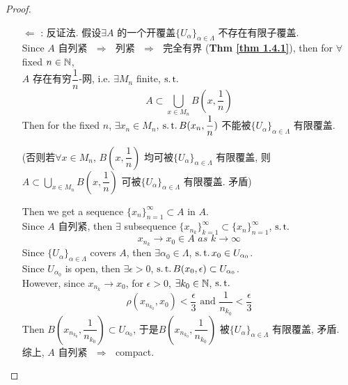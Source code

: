 \begin{thm}
\begin{proof}
\begin{enumerate}
				\item[$\Leftarrow$]: 反证法. 假设$\exists A$ 的一个开覆盖$\{ U_\alpha \}_{\alpha \in \Lambda}$ 不存在有限子覆盖. \\
				Since $A$ 自列紧 $\,\, \Rightarrow \,\,$ 列紧 $\,\, \Rightarrow \,\,$ 完全有界 (\textbf{Thm \ref{thm 1.4.1}}), then for $\forall$ fixed $n \in \mathbb{N}$, \\
				$A$ 存在有穷$\dfrac{1}{n}$-网, i.e. $\exists M_n$ finite, $\operatorname{s.t.}$
				\[ A \subset \bigcup_{x \in M_n} B(x , \frac{1}{n}) \]
				Then for the fixed $n$, $\exists x_n \in M_n$, $\operatorname{s.t.} B(x_n , \dfrac{1}{n})$ 不能被$\{ U_\alpha \}_{\alpha \in \Lambda}$ 有限覆盖.
				\begin{center}
					(否则若$\forall x \in M_n$, $B(x , \dfrac{1}{n})$ 均可被$\{ U_\alpha \}_{\alpha \in \Lambda}$ 有限覆盖, 则$A \subset \bigcup_{x \in M_n} B(x , \dfrac{1}{n})$ 可被$\{ U_\alpha \}_{\alpha \in \Lambda}$ 有限覆盖. 矛盾)
				\end{center}
				Then we get a sequence $\{ x_n \}_{n = 1}^{\infty} \subset A$ in $A$. \\
				Since $A$ 自列紧, then $\exists$ subsequence $\{ x_{n_k} \}_{k = 1}^{\infty} \subset \{ x_n \}_{n = 1}^{\infty}$, $\operatorname{s.t.}$
				\[ x_{n_k} \to x_0 \in A \,\, as \,\, k \to \infty \]
				Since $\{ U_\alpha \}_{\alpha \in \Lambda}$ covers $A$, then $\exists \alpha_0 \in \Lambda$, $\operatorname{s.t.} x_0 \in U_{\alpha_0}$. \\
				Since $U_{\alpha_0}$ is open, then $\exists \epsilon > 0$, $\operatorname{s.t.} B(x_0 , \epsilon) \subset U_{\alpha_0}$. \\
				However, since $x_{n_k} \to x_0$, for $\epsilon > 0$, $\exists k_0 \in \mathbb{N}$, $\operatorname{s.t.}$
				\[ \rho(x_{n_{k_0}} , x_0) < \frac{\epsilon}{3} \,\, \text{and} \,\, \frac{1}{n_{k_0}} < \frac{\epsilon}{3} \]
				Then $B(x_{n_{k_0}} , \dfrac{1}{n_{k_0}}) \subset U_{\alpha_0}$, 于是$B(x_{n_{k_0}} , \dfrac{1}{n_{k_0}})$ 被$\{ U_\alpha \}_{\alpha \in \Lambda}$ 有限覆盖, 矛盾. \\
				综上, $A$ 自列紧 $\,\, \Rightarrow \,\,$ compact.
			\end{enumerate}
		\end{proof}
	\end{thm}



	\ifx\allfiles\undefined

\fi